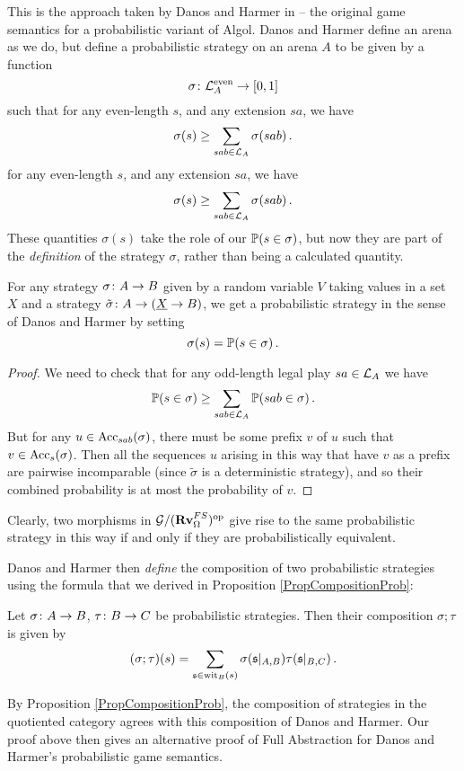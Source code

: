 This is the approach taken by Danos and Harmer in \cite{DanosHarmer} -- the original game semantics for a probabilistic variant of Algol.  
Danos and Harmer define an arena as we do, but define a probabilistic strategy on an arena $A$ to be given by a function
\[
  \sigma \colon \mathcal L_A^{\text{even}} \to [0,1]
  \]
such that for any even-length $s$, and any extension $sa$, we have
\[
  \sigma(s) \ge \sum_{sab\in\mathcal L_A} \sigma(sab)\,.
  \]for any even-length $s$, and any extension $sa$, we have
\[
  \sigma(s) \ge \sum_{sab\in\mathcal L_A} \sigma(sab)\,.
  \]
These quantities $\sigma(s)$ take the role of our $\mathbb{P}(s\in\sigma)$, but now they are part of the \emph{definition} of the strategy $\sigma$, rather than being a calculated quantity.

\begin{proposition}
  For any \Mellies strategy $\sigma\colon A \to B$ given by a random variable $V$ taking values in a set $X$ and a strategy $\tilde\sigma \colon A \to ({\underline{X}} \to B)$, we get a probabilistic strategy in the sense of Danos and Harmer by setting
  \[
    \sigma(s)=\mathbb{P}(s\in\sigma)\,.
    \]
\end{proposition}
\begin{proof}
  We need to check that for any odd-length legal play $sa\in \mathcal L_A$ we have
  \[
    \mathbb{P}(s\in\sigma) \ge \sum_{sab\in \mathcal L_A} \mathbb{P}(sab\in\sigma)\,.
    \]
  But for any $u\in\operatorname{Acc}_{sab}(\sigma)$, there must be some prefix $v$ of $u$ such that $v\in\operatorname{Acc}_s(\sigma)$.
  Then all the sequences $u$ arising in this way that have $v$ as a prefix are pairwise incomparable (since $\tilde\sigma$ is a deterministic strategy), and so their combined probability is at most the probability of $v$.
\end{proof}
Clearly, two morphisms in $\mathcal G/({\normalfont\textbf{Rv}}_\Omega^{FS})^{\mathrm{op}}$ give rise to the same probabilistic strategy in this way if and only if they are probabilistically equivalent.

Danos and Harmer then \emph{define} the composition of two probabilistic strategies using the formula that we derived in Proposition \ref{PropCompositionProb}:

\begin{definition}
  Let $\sigma\colon A \to B$, $\tau \colon B \to C$ be probabilistic strategies.  
  Then their composition $\sigma;\tau$ is given by
  \[
    (\sigma;\tau)(s) = \sum_{\mathfrak s\in\operatorname{wit}_B(s)} \sigma(\mathfrak s\vert_{A,B})\tau(\mathfrak s\vert_{B,C})\,.
    \]
\end{definition}
By Proposition \ref{PropCompositionProb}, the composition of strategies in the quotiented category agrees with this composition of Danos and Harmer.
Our proof above then gives an alternative proof of Full Abstraction for Danos and Harmer's probabilistic game semantics.
